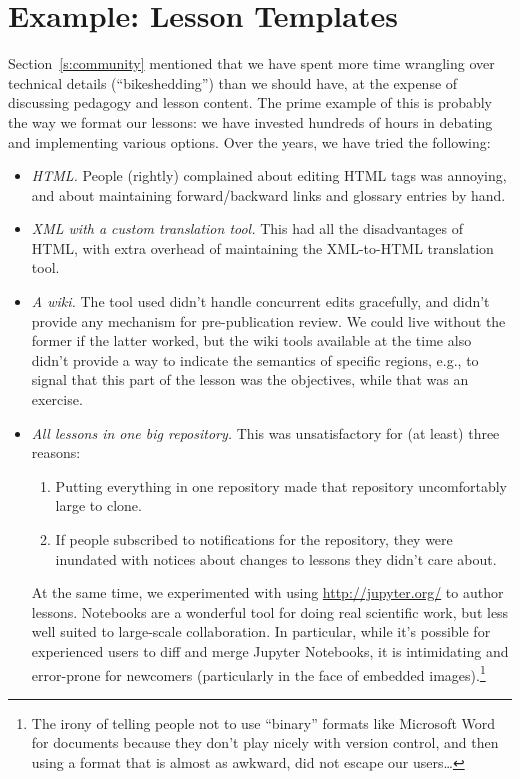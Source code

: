 \documentclass[10pt,a4paper,twocolumn]{article}
\begin{document}
\section{Example: Lesson Templates}\label{s:lesson-templates}

Section~\ref{s:community} mentioned that we have spent more time
wrangling over technical details (``bikeshedding'') than we should
have, at the expense of discussing pedagogy and lesson content.  The
prime example of this is probably the way we format our lessons: we
have invested hundreds of hours in debating and implementing various
options.  Over the years, we have tried the following:

\begin{itemize}

\item \emph{HTML.}  People (rightly) complained about editing HTML
  tags was annoying, and about maintaining forward/backward links and
  glossary entries by hand.

\item \emph{XML with a custom translation tool.}  This had all the
  disadvantages of HTML, with extra overhead of maintaining the
  XML-to-HTML translation tool.

\item \emph{A wiki.} The tool used didn't handle concurrent edits
  gracefully, and didn't provide any mechanism for pre-publication
  review.  We could live without the former if the latter worked, but
  the wiki tools available at the time also didn't provide a way to
  indicate the semantics of specific regions, e.g., to signal that
  this part of the lesson was the objectives, while that was an
  exercise.

\item \emph{All lessons in one big repository.}  This was
  unsatisfactory for (at least) three reasons:

  \begin{enumerate}

  \item Putting everything in one repository made that repository
    uncomfortably large to clone.

  \item If people subscribed to notifications for the repository, they
    were inundated with notices about changes to lessons they didn't
    care about.

  \end{enumerate}

  At the same time, we experimented with using \href{Jupyter
  Notebooks}{http://jupyter.org/} to author lessons.  Notebooks are
  a wonderful tool for doing real scientific work, but less well
  suited to large-scale collaboration.  In particular, while it's
  possible for experienced users to diff and merge Jupyter Notebooks,
  it is intimidating and error-prone for newcomers (particularly in
  the face of embedded images).\footnote{The irony of telling people
    not to use ``binary'' formats like Microsoft Word for documents
    because they don't play nicely with version control, and then
    using a format that is almost as awkward, did not escape our
    users{\ldots}}



\end{itemize}
\end{document}
